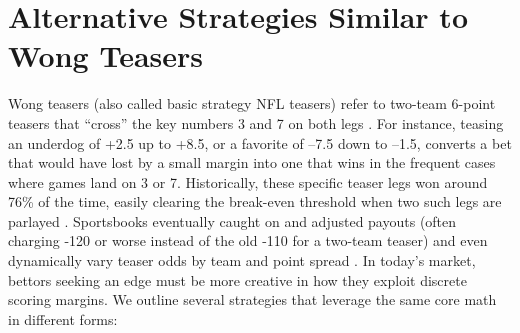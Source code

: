 \documentclass[12pt]{article}
\begin{document}
\section{Alternative Strategies Similar to Wong Teasers}
Wong teasers (also called basic strategy NFL teasers) refer to two-team 6-point teasers that “cross” the key numbers 3 and 7 on both legs \cite{Wong2001}. For instance, teasing an underdog of +2.5 up to +8.5, or a favorite of --7.5 down to --1.5, converts a bet that would have lost by a small margin into one that wins in the frequent cases where games land on 3 or 7. Historically, these specific teaser legs won around 76\% of the time, easily clearing the break-even threshold when two such legs are parlayed \cite{Andrews2024}. Sportsbooks eventually caught on and adjusted payouts (often charging -120 or worse instead of the old -110 for a two-team teaser) and even dynamically vary teaser odds by team and point spread \cite{Andrews2024}. In today’s market, bettors seeking an edge must be more creative in how they exploit discrete scoring margins. We outline several strategies that leverage the same core math in different forms:
\end{document}
